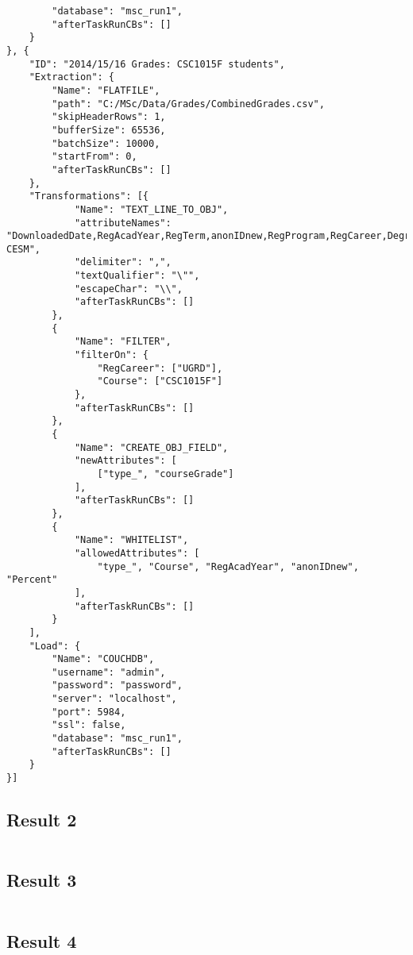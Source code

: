 \begin{verbatim}
        "database": "msc_run1",
        "afterTaskRunCBs": []
    }
}, {
    "ID": "2014/15/16 Grades: CSC1015F students",
    "Extraction": {
        "Name": "FLATFILE",
        "path": "C:/MSc/Data/Grades/CombinedGrades.csv",
        "skipHeaderRows": 1,
        "bufferSize": 65536,
        "batchSize": 10000,
        "startFrom": 0,
        "afterTaskRunCBs": []
    },
    "Transformations": [{
            "Name": "TEXT_LINE_TO_OBJ",
            "attributeNames": "DownloadedDate,RegAcadYear,RegTerm,anonIDnew,RegProgram,RegCareer,Degree,DegreeDescr,Subject,Catalog.,Course,CourseSuffix,Session,Percent,Symbol,UnitsTaken,CourseID,CourseDescr,CourseCareer,Faculty,Dept,MaximumCrseUnits,CourseCount,CourseLevel,CESM,Sub-CESM",
            "delimiter": ",",
            "textQualifier": "\"",
            "escapeChar": "\\",
            "afterTaskRunCBs": []
        },
        {
            "Name": "FILTER",
            "filterOn": {
                "RegCareer": ["UGRD"],
                "Course": ["CSC1015F"]
            },
            "afterTaskRunCBs": []
        },
        {
            "Name": "CREATE_OBJ_FIELD",
            "newAttributes": [
                ["type_", "courseGrade"]
            ],
            "afterTaskRunCBs": []
        },
        {
            "Name": "WHITELIST",
            "allowedAttributes": [
                "type_", "Course", "RegAcadYear", "anonIDnew", "Percent"
            ],
            "afterTaskRunCBs": []
        }
    ],
    "Load": {
        "Name": "COUCHDB",
        "username": "admin",
        "password": "password",
        "server": "localhost",
        "port": 5984,
        "ssl": false,
        "database": "msc_run1",
        "afterTaskRunCBs": []
    }
}]
\end{verbatim}

\subsection{Result 2}
\label{netl-run2-config}
\begin{verbatim}
\end{verbatim}

\subsection{Result 3}
\label{netl-run3-config}
\begin{verbatim}
\end{verbatim}

\subsection{Result 4}
\label{netl-run4-config}
\begin{verbatim}
\end{verbatim}